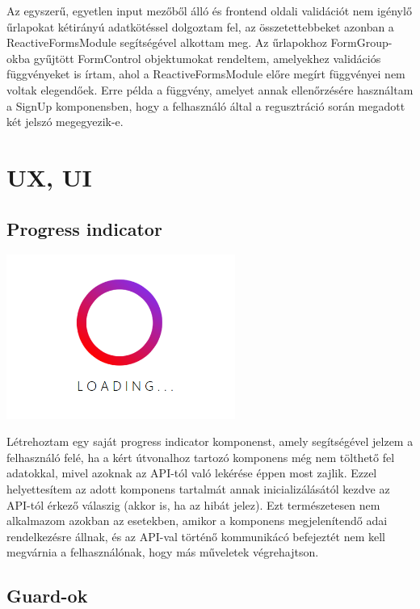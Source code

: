 \documentclass[a4paper,12pt]{report}
\theoremstyle{definition}
\theoremstyle{remark}
\begin{document}
Az egyszerű, egyetlen input mezőből álló és frontend oldali validációt nem igénylő űrlapokat kétirányú adatkötéssel dolgoztam fel, az összetettebbeket azonban a ReactiveFormsModule\cite{ReactiveFormswebsite} segítségével alkottam meg. Az űrlapokhoz FormGroup-okba gyűjtött FormControl objektumokat rendeltem, amelyekhez validációs függvényeket is írtam, ahol a ReactiveFormsModule előre megírt függvényei nem voltak elegendőek. Erre példa a függvény, amelyet annak ellenőrzésére használtam a SignUp komponensben, hogy a felhasználó által a regusztráció során megadott két jelszó megegyezik-e.

\section{UX, UI}

	\subsection{Progress indicator}

\begin{center}
\includegraphics[width=75mm]{progress_indicator}
\captionsetup{width=0.8\linewidth}
\end{center}

Létrehoztam egy saját progress indicator komponenst, amely segítségével jelzem a felhasználó felé, ha a kért útvonalhoz tartozó komponens még nem tölthető fel adatokkal, mivel azoknak az API-tól való lekérése éppen most zajlik. Ezzel helyettesítem az adott komponens tartalmát annak inicializálásától kezdve az API-tól érkező válaszig (akkor is, ha az hibát jelez). Ezt természetesen nem alkalmazom azokban az esetekben, amikor a komponens megjelenítendő adai rendelkezésre állnak, és az API-val történő kommunikácó befejeztét nem kell megvárnia a felhasználónak, hogy más műveletek végrehajtson.

	\subsection{Guard-ok}
\end{document}
